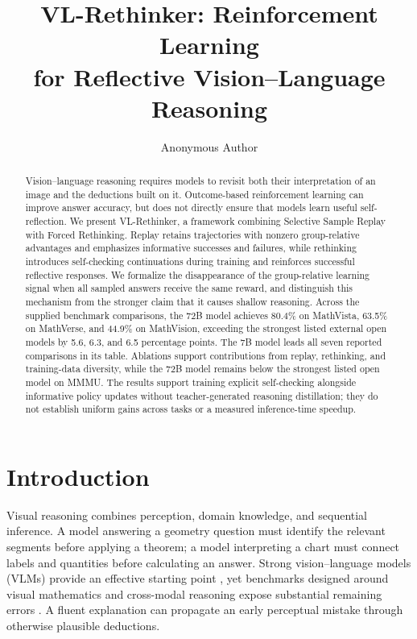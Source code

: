 \documentclass[10pt,twocolumn]{article}
\title{VL-Rethinker: Reinforcement Learning\\for Reflective Vision--Language Reasoning}
\author{Anonymous Author}
\date{}
\begin{document}
\maketitle
\begin{abstract}
Vision--language reasoning requires models to revisit both their interpretation of an image and the deductions built on it. Outcome-based reinforcement learning can improve answer accuracy, but does not directly ensure that models learn useful self-reflection. We present VL-Rethinker, a framework combining Selective Sample Replay with Forced Rethinking. Replay retains trajectories with nonzero group-relative advantages and emphasizes informative successes and failures, while rethinking introduces self-checking continuations during training and reinforces successful reflective responses. We formalize the disappearance of the group-relative learning signal when all sampled answers receive the same reward, and distinguish this mechanism from the stronger claim that it causes shallow reasoning. Across the supplied benchmark comparisons, the 72B model achieves 80.4\% on MathVista, 63.5\% on MathVerse, and 44.9\% on MathVision, exceeding the strongest listed external open models by 5.6, 6.3, and 6.5 percentage points. The 7B model leads all seven reported comparisons in its table. Ablations support contributions from replay, rethinking, and training-data diversity, while the 72B model remains below the strongest listed open model on MMMU. The results support training explicit self-checking alongside informative policy updates without teacher-generated reasoning distillation; they do not establish uniform gains across tasks or a measured inference-time speedup.
\end{abstract}

\section{Introduction}
Visual reasoning combines perception, domain knowledge, and sequential inference. A model answering a geometry question must identify the relevant segments before applying a theorem; a model interpreting a chart must connect labels and quantities before calculating an answer. Strong vision--language models (VLMs) provide an effective starting point \citep{qwen2_5_vl,internvl_2_5,llavaov}, yet benchmarks designed around visual mathematics and cross-modal reasoning expose substantial remaining errors \citep{mathvista,mathverse,mathvision,emma}. A fluent explanation can propagate an early perceptual mistake through otherwise plausible deductions.
\end{document}
